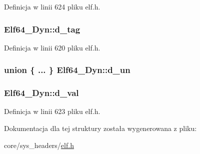 Definicja w linii 624 pliku elf.\-h.

\hypertarget{struct_elf64___dyn_a74a63e5acb7d8ddc946a5b0c5eb3c26a}{
\subsubsection[{d\-\_\-tag}]{ Elf64\-\_\-\-Dyn\-::d\-\_\-tag}}\label{struct_elf64___dyn_a74a63e5acb7d8ddc946a5b0c5eb3c26a}


Definicja w linii 620 pliku elf.\-h.

\hypertarget{struct_elf64___dyn_acc39d52f3a8efd552afa2e3369c03215}{
\subsubsection[{d\-\_\-un}]{\setlength{\rightskip}{0pt plus 5cm}union \{ ... \}   Elf64\-\_\-\-Dyn\-::d\-\_\-un}}\label{struct_elf64___dyn_acc39d52f3a8efd552afa2e3369c03215}
\hypertarget{struct_elf64___dyn_ab1741378fc34cbcc8caf3f7bb5e6de18}{
\subsubsection[{d\-\_\-val}]{ Elf64\-\_\-\-Dyn\-::d\-\_\-val}}\label{struct_elf64___dyn_ab1741378fc34cbcc8caf3f7bb5e6de18}


Definicja w linii 623 pliku elf.\-h.



Dokumentacja dla tej struktury została wygenerowana z pliku\-:\begin{DoxyCompactItemize}
\item 
core/sys\-\_\-headers/\hyperlink{elf_8h}{elf.\-h}\end{DoxyCompactItemize}
